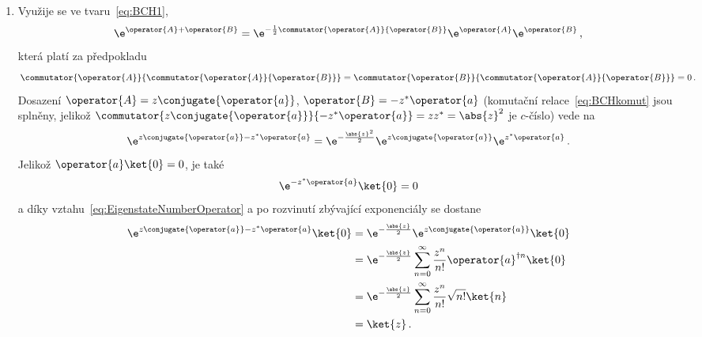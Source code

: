 \begin{solution}
\begin{enumerate}
		\item
			Využije se  ve tvaru~\eqref{eq:BCH1},
			\begin{equation}
				\e^{\operator{A}+\operator{B}}=\e^{-\frac{1}{2}\commutator{\operator{A}}{\operator{B}}}\e^{\operator{A}}\e^{\operator{B}}\,,
			\end{equation}
			která platí za předpokladu
			\begin{equation}
				\label{eq:BCHkomut}
				\commutator{\operator{A}}{\commutator{\operator{A}}{\operator{B}}}=\commutator{\operator{B}}{\commutator{\operator{A}}{\operator{B}}}=0\,.
			\end{equation}
			Dosazení $\operator{A}=z\conjugate{\operator{a}}$, $\operator{B}=-z^{*}\operator{a}$
			(komutační relace~\eqref{eq:BCHkomut} jsou splněny, jelikož $\commutator{z\conjugate{\operator{a}}}{-z^{*}\operator{a}}=zz^{*}=\abs{z}^{2}$ je $c$-číslo) vede na
			\begin{equation}
				\e^{z\conjugate{\operator{a}}-z^{*}\operator{a}}
					=\e^{-\frac{\abs{z}^{2}}{2}}\e^{z\conjugate{\operator{a}}}\e^{z^{*}\operator{a}}\,.
			\end{equation}
			Jelikož $\operator{a}\ket{0}=0$, je také
			\begin{equation}
				\e^{-z^{*}\operator{a}}\ket{0}=0
			\end{equation}
			a díky vztahu~\eqref{eq:EigenstateNumberOperator} a po rozvinutí zbývající exponenciály se dostane
			\begin{align}
				\e^{z\conjugate{\operator{a}}-z^{*}\operator{a}}\ket{0}
					&=\e^{-\frac{\abs{z}}{2}}\e^{z\conjugate{\operator{a}}}\ket{0}\nonumber\\
					&=\e^{-\frac{\abs{z}}{2}}\sum_{n=0}^{\infty}
						\frac{z^{n}}{n!}\operator{a}^{\dagger n}\ket{0}\nonumber\\
					&=\e^{-\frac{\abs{z}}{2}}\sum_{n=0}^{\infty}
						\frac{z^{n}}{n!}\sqrt{n!}\ket{n}\nonumber\\
					&=\ket{z}\,.
			\end{align}


\end{enumerate}
\end{solution}
